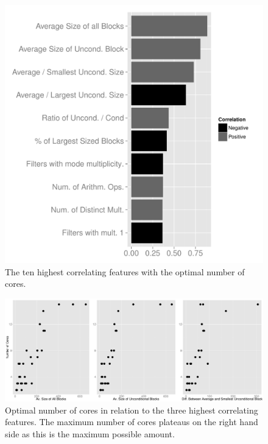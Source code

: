 
\begin{figure}[t]
  \includegraphics[width=1\textwidth]{streamit-paper/graphics/coreCorr.pdf}
  \caption{The ten highest correlating features with the optimal number of cores.}\label{fig:corrCore}
\end{figure}

\begin{figure}[t]
  \center
  \includegraphics[width=1\textwidth]{streamit-paper/graphics/lineargraphs.pdf}
  \caption{Optimal number of cores in relation to the three highest correlating features. The maximum number of cores plateaus on the right hand side as this is the maximum possible amount.}\label{fig:maxav}
\end{figure}


